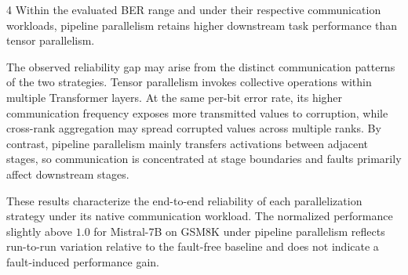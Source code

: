 \begin{observationbox}{4}
Within the evaluated BER range and under their respective communication
workloads, pipeline parallelism retains higher downstream task performance
than tensor parallelism.
\end{observationbox}

The observed reliability gap may arise from the distinct communication patterns of the two strategies. Tensor parallelism invokes collective operations within multiple Transformer layers. At the same per-bit error rate, its higher communication frequency exposes more transmitted values to corruption, while cross-rank aggregation may spread corrupted values across multiple ranks. By contrast, pipeline parallelism mainly transfers activations between adjacent stages, so communication is concentrated at stage boundaries and faults primarily affect downstream stages.

These results characterize the end-to-end reliability of each parallelization strategy under its native communication workload. The normalized performance slightly above \(1.0\) for Mistral-7B on GSM8K under pipeline parallelism reflects run-to-run variation relative to the fault-free baseline and does not indicate a fault-induced performance gain.






